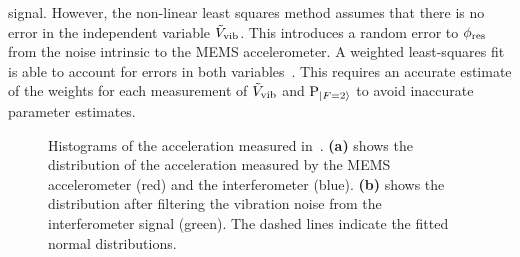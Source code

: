 signal. However, the non-linear least squares method assumes that
there is no error in the independent variable
$\tilde{V}_\textnormal{vib}$. This introduces a random
error to $\phi_\textnormal{res}$ from the noise intrinsic to the MEMS
accelerometer. A weighted least-squares fit is
able to account for errors in both variables~\cite{Macdonald1992}. This requires an
accurate estimate of the weights for each measurement of
$\tilde{V}_\textnormal{vib}$ and $\text{P}_{\ket{F=2}}$ to avoid inaccurate
parameter estimates.
\begin{figure}[htpb!]
  \centering
  \caption[Histogram of acceleration noise.]{Histograms of the
    acceleration measured in~. \textbf{(a)} shows
    the distribution of the acceleration measured by the MEMS
    accelerometer (red) and the interferometer (blue). \textbf{(b)} shows
    the distribution after filtering the vibration noise from the
    interferometer signal (green). The dashed lines indicate the
  fitted normal distributions.}
  \label{fig:vibration_hists}
\end{figure}


